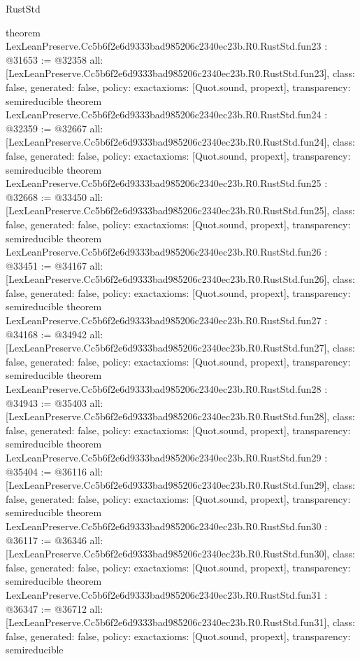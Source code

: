 \begin{lexlean}{RustStd}
\begin{coremodule}
{}
theorem LexLeanPreserve.Cc5b6f2e6d9333bad985206c2340ec23b.R0.RustStd.fun23 : @31653 := @32358 {
  all: [LexLeanPreserve.Cc5b6f2e6d9333bad985206c2340ec23b.R0.RustStd.fun23],
  class: false,
  generated: false,
  policy: exact{axioms: [Quot.sound, propext]},
  transparency: semireducible
}
theorem LexLeanPreserve.Cc5b6f2e6d9333bad985206c2340ec23b.R0.RustStd.fun24 : @32359 := @32667 {
  all: [LexLeanPreserve.Cc5b6f2e6d9333bad985206c2340ec23b.R0.RustStd.fun24],
  class: false,
  generated: false,
  policy: exact{axioms: [Quot.sound, propext]},
  transparency: semireducible
}
theorem LexLeanPreserve.Cc5b6f2e6d9333bad985206c2340ec23b.R0.RustStd.fun25 : @32668 := @33450 {
  all: [LexLeanPreserve.Cc5b6f2e6d9333bad985206c2340ec23b.R0.RustStd.fun25],
  class: false,
  generated: false,
  policy: exact{axioms: [Quot.sound, propext]},
  transparency: semireducible
}
theorem LexLeanPreserve.Cc5b6f2e6d9333bad985206c2340ec23b.R0.RustStd.fun26 : @33451 := @34167 {
  all: [LexLeanPreserve.Cc5b6f2e6d9333bad985206c2340ec23b.R0.RustStd.fun26],
  class: false,
  generated: false,
  policy: exact{axioms: [Quot.sound, propext]},
  transparency: semireducible
}
theorem LexLeanPreserve.Cc5b6f2e6d9333bad985206c2340ec23b.R0.RustStd.fun27 : @34168 := @34942 {
  all: [LexLeanPreserve.Cc5b6f2e6d9333bad985206c2340ec23b.R0.RustStd.fun27],
  class: false,
  generated: false,
  policy: exact{axioms: [Quot.sound, propext]},
  transparency: semireducible
}
theorem LexLeanPreserve.Cc5b6f2e6d9333bad985206c2340ec23b.R0.RustStd.fun28 : @34943 := @35403 {
  all: [LexLeanPreserve.Cc5b6f2e6d9333bad985206c2340ec23b.R0.RustStd.fun28],
  class: false,
  generated: false,
  policy: exact{axioms: [Quot.sound, propext]},
  transparency: semireducible
}
theorem LexLeanPreserve.Cc5b6f2e6d9333bad985206c2340ec23b.R0.RustStd.fun29 : @35404 := @36116 {
  all: [LexLeanPreserve.Cc5b6f2e6d9333bad985206c2340ec23b.R0.RustStd.fun29],
  class: false,
  generated: false,
  policy: exact{axioms: [Quot.sound, propext]},
  transparency: semireducible
}
theorem LexLeanPreserve.Cc5b6f2e6d9333bad985206c2340ec23b.R0.RustStd.fun30 : @36117 := @36346 {
  all: [LexLeanPreserve.Cc5b6f2e6d9333bad985206c2340ec23b.R0.RustStd.fun30],
  class: false,
  generated: false,
  policy: exact{axioms: [Quot.sound, propext]},
  transparency: semireducible
}
theorem LexLeanPreserve.Cc5b6f2e6d9333bad985206c2340ec23b.R0.RustStd.fun31 : @36347 := @36712 {
  all: [LexLeanPreserve.Cc5b6f2e6d9333bad985206c2340ec23b.R0.RustStd.fun31],
  class: false,
  generated: false,
  policy: exact{axioms: [Quot.sound, propext]},
  transparency: semireducible
}
\end{coremodule}
\end{lexlean}
